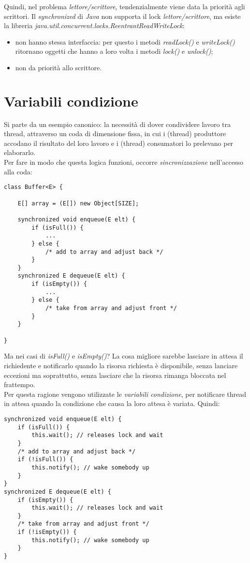 Quindi, nel problema \textit{lettore/scrittore}, tendenzialmente viene data la priorità agli scrittori.
Il \textit{synchronized} di \textit{Java} non supporta il lock \textit{lettore/scrittore}, ma esiste la libreria \textit{java.util.concurrent.locks.ReentrantReadWriteLock}:
\begin{itemize}
	\item non hanno stessa interfaccia: per questo i metodi \textit{readLock()} e \textit{writeLock()} ritornano oggetti che hanno a loro volta i metodi \textit{lock()} e \textit{unlock()};
	\item non da priorità allo scrittore.
\end{itemize}

\section{Variabili condizione}
Si parte da un esempio canonico: la necessità di dover condividere lavoro tra thread, attraverso un coda di dimensione fissa, in cui i (thread) produttore accodano il risultato del loro lavoro e i (thread) consumatori lo prelevano per elaborarlo. \\
\newpage
Per fare in modo che questa logica funzioni, occorre \textit{sincronizzazione} nell'accesso alla coda:
\begin{lstlisting}
class Buffer<E> {

	E[] array = (E[]) new Object[SIZE];
	
	synchronized void enqueue(E elt) {
		if (isFull()) {
			...
		} else {
			/* add to array and adjust back */
		}
	}
	synchronized E dequeue(E elt) {
		if (isEmpty()) {
			...
		} else {
			/* take from array and adjust front */
		}
	}

}
\end{lstlisting}
Ma nei casi di \textit{isFull()} e \textit{isEmpty()}? La cosa migliore sarebbe lasciare in attesa il richiedente e notificarlo quando la risorsa richiesta è disponibile, senza lanciare eccezioni ma soprattutto, senza lasciare che la risorsa rimanga bloccata nel frattempo. \\
Per questa ragione vengono utilizzate le \textit{variabili condizione}, per notificare thread in attesa quando la condizione che causa la loro attesa è variata. Quindi:
\begin{lstlisting}
synchronized void enqueue(E elt) {
	if (isFull()) {
		this.wait(); // releases lock and wait
	}
	/* add to array and adjust back */
	if (!isFull()) {
		this.notify(); // wake somebody up
	}
}
synchronized E dequeue(E elt) {
	if (isEmpty()) {
		this.wait(); // releases lock and wait
	}
	/* take from array and adjust front */
	if (!isEmpty()) {
		this.notify(); // wake somebody up
	}
}
\end{lstlisting}

